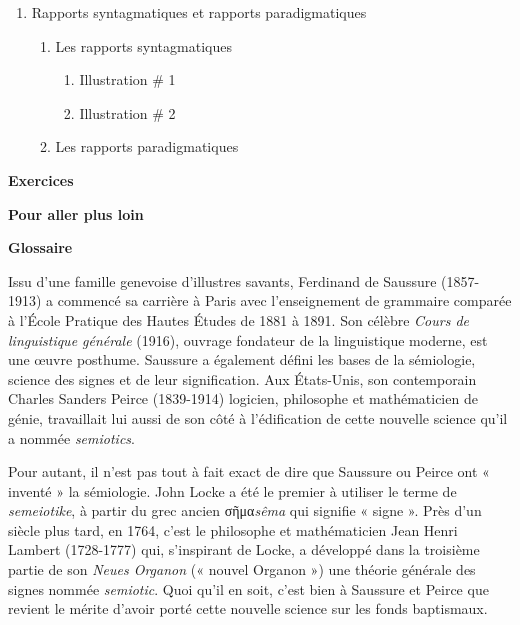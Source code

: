 \begin{keybox}
\begin{enumerate}[label=\arabic*.]
\begin{enumerate}[label=\textcircled{\scriptsize\arabic*}]
\begin{enumerate}[label=\arabic*.]
\item La synchronie
\item La diachronie
\end{enumerate}
\item Rapports syntagmatiques et rapports paradigmatiques
\begin{enumerate}[label=\arabic*.]
\item Les rapports syntagmatiques
\begin{enumerate}[label=\arabic*)]
\item Illustration \# 1
\item Illustration \# 2
\end{enumerate}
\item Les rapports paradigmatiques
\end{enumerate}
\end{enumerate}
\end{enumerate}
\textbf{Exercices}\par
\textbf{Pour aller plus loin}\par
\textbf{Glossaire}
\end{keybox}

\begin{keybox}[Introduction]
Issu d’une famille genevoise d’illustres savants, Ferdinand de Saussure (1857-1913) a commencé sa carrière à Paris avec l’enseignement de grammaire comparée à l’École Pratique des Hautes Études de 1881 à 1891. Son célèbre \textit{Cours de linguistique générale} (1916), ouvrage fondateur de la linguistique moderne, est une œuvre posthume. Saussure a également défini les bases de la sémiologie, science des signes et de leur signification. Aux États-Unis, son contemporain Charles Sanders Peirce (1839-1914) logicien, philosophe et mathématicien de génie, travaillait lui aussi de son côté à l’édification de cette nouvelle science qu’il a nommée \textit{semiotics}.

Pour autant, il n’est pas tout à fait exact de dire que Saussure ou Peirce ont « inventé » la sémiologie. John Locke a été le premier à utiliser le terme de \textit{semeiotike}, à partir du grec ancien {\BBSixGreek σῆμα}\textit{sêma} qui signifie « signe ». Près d’un siècle plus tard, en 1764, c’est le philosophe et mathématicien Jean Henri Lambert (1728-1777) qui, s’inspirant de Locke, a développé dans la troisième partie de son \textit{Neues Organon} (« nouvel Organon ») une théorie générale des signes nommée \textit{semiotic}. Quoi qu’il en soit, c’est bien à Saussure et Peirce que revient le mérite d’avoir porté cette nouvelle science sur les fonds baptismaux.
\end{keybox}

